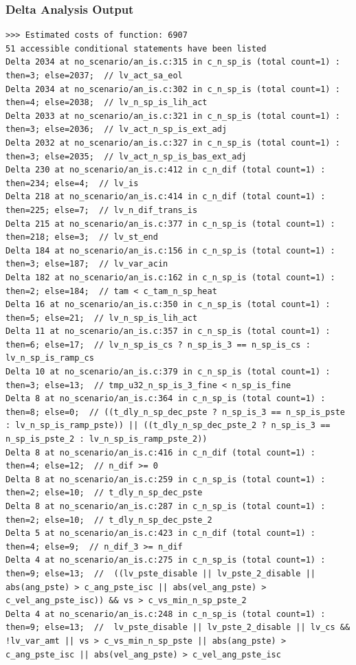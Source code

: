 \documentclass{beamer}
\begin{document}
\begin{frame}[fragile]
  \frametitle{Delta Analysis Output}

  \bigskip
  {\tiny
  \begin{verbatim}
>>> Estimated costs of function: 6907
51 accessible conditional statements have been listed
Delta 2034 at no_scenario/an_is.c:315 in c_n_sp_is (total count=1) : then=3; else=2037;  // lv_act_sa_eol
Delta 2034 at no_scenario/an_is.c:302 in c_n_sp_is (total count=1) : then=4; else=2038;  // lv_n_sp_is_lih_act
Delta 2033 at no_scenario/an_is.c:321 in c_n_sp_is (total count=1) : then=3; else=2036;  // lv_act_n_sp_is_ext_adj
Delta 2032 at no_scenario/an_is.c:327 in c_n_sp_is (total count=1) : then=3; else=2035;  // lv_act_n_sp_is_bas_ext_adj
Delta 230 at no_scenario/an_is.c:412 in c_n_dif (total count=1) : then=234; else=4;  // lv_is
Delta 218 at no_scenario/an_is.c:414 in c_n_dif (total count=1) : then=225; else=7;  // lv_n_dif_trans_is
Delta 215 at no_scenario/an_is.c:377 in c_n_sp_is (total count=1) : then=218; else=3;  // lv_st_end
Delta 184 at no_scenario/an_is.c:156 in c_n_sp_is (total count=1) : then=3; else=187;  // lv_var_acin
Delta 182 at no_scenario/an_is.c:162 in c_n_sp_is (total count=1) : then=2; else=184;  // tam < c_tam_n_sp_heat
Delta 16 at no_scenario/an_is.c:350 in c_n_sp_is (total count=1) : then=5; else=21;  // lv_n_sp_is_lih_act
Delta 11 at no_scenario/an_is.c:357 in c_n_sp_is (total count=1) : then=6; else=17;  // lv_n_sp_is_cs ? n_sp_is_3 == n_sp_is_cs : lv_n_sp_is_ramp_cs
Delta 10 at no_scenario/an_is.c:379 in c_n_sp_is (total count=1) : then=3; else=13;  // tmp_u32_n_sp_is_3_fine < n_sp_is_fine
Delta 8 at no_scenario/an_is.c:364 in c_n_sp_is (total count=1) : then=8; else=0;  // ((t_dly_n_sp_dec_pste ? n_sp_is_3 == n_sp_is_pste : lv_n_sp_is_ramp_pste)) || ((t_dly_n_sp_dec_pste_2 ? n_sp_is_3 == n_sp_is_pste_2 : lv_n_sp_is_ramp_pste_2))
Delta 8 at no_scenario/an_is.c:416 in c_n_dif (total count=1) : then=4; else=12;  // n_dif >= 0
Delta 8 at no_scenario/an_is.c:259 in c_n_sp_is (total count=1) : then=2; else=10;  // t_dly_n_sp_dec_pste
Delta 8 at no_scenario/an_is.c:287 in c_n_sp_is (total count=1) : then=2; else=10;  // t_dly_n_sp_dec_pste_2
Delta 5 at no_scenario/an_is.c:423 in c_n_dif (total count=1) : then=4; else=9;  // n_dif_3 >= n_dif
Delta 4 at no_scenario/an_is.c:275 in c_n_sp_is (total count=1) : then=9; else=13;  // 	((lv_pste_disable || lv_pste_2_disable || abs(ang_pste) > c_ang_pste_isc || abs(vel_ang_pste) > c_vel_ang_pste_isc)) && vs > c_vs_min_n_sp_pste_2
Delta 4 at no_scenario/an_is.c:248 in c_n_sp_is (total count=1) : then=9; else=13;  // 	lv_pste_disable || lv_pste_2_disable || lv_cs && !lv_var_amt || vs > c_vs_min_n_sp_pste || abs(ang_pste) > c_ang_pste_isc || abs(vel_ang_pste) > c_vel_ang_pste_isc

\end{verbatim}}
\end{frame}
\end{document}
